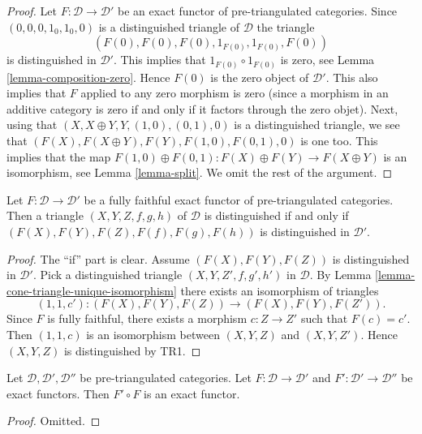 \begin{proof}
Let $F : \mathcal{D} \to \mathcal{D}'$ be an exact functor of
pre-triangulated categories. Since
$(0, 0, 0, 1_0, 1_0, 0)$ is a distinguished triangle of $\mathcal{D}$
the triangle
$$
(F(0), F(0), F(0), 1_{F(0)}, 1_{F(0)}, F(0))
$$
is distinguished in $\mathcal{D}'$.
This implies that $1_{F(0)} \circ 1_{F(0)}$ is zero, see
Lemma \ref{lemma-composition-zero}.
Hence $F(0)$ is the zero object of $\mathcal{D}'$. This also implies
that $F$ applied to any zero morphism is zero (since a morphism in
an additive category is zero if and only if it factors through the
zero objet). Next, using that
$(X, X \oplus Y, Y, (1, 0), (0, 1), 0)$ is a distinguished triangle,
we see that $(F(X), F(X \oplus Y), F(Y), F(1, 0), F(0, 1), 0)$ is
one too. This implies that the map
$F(1, 0) \oplus F(0, 1) : F(X) \oplus F(Y) \to F(X \oplus Y)$
is an isomorphism, see
Lemma \ref{lemma-split}.
We omit the rest of the argument.
\end{proof}

\begin{lemma}
\label{lemma-exact-equivalence}
Let $F : \mathcal{D} \to \mathcal{D}'$ be a fully faithful exact functor
of pre-triangulated categories. Then a triangle $(X, Y, Z, f, g, h)$
of $\mathcal{D}$ is distinguished if and only if
$(F(X), F(Y), F(Z), F(f), F(g), F(h))$ is distinguished in $\mathcal{D}'$.
\end{lemma}

\begin{proof}
The ``if'' part is clear. Assume $(F(X), F(Y), F(Z))$ is
distinguished in $\mathcal{D}'$. Pick a distinguished triangle
$(X, Y, Z', f, g', h')$ in $\mathcal{D}$. By
Lemma \ref{lemma-cone-triangle-unique-isomorphism}
there exists an isomorphism of triangles
$$
(1, 1, c') : (F(X), F(Y), F(Z)) \longrightarrow (F(X), F(Y), F(Z')).
$$
Since $F$ is fully faithful, there exists a morphism $c : Z \to Z'$
such that $F(c) = c'$. Then $(1, 1, c)$ is an isomorphism between
$(X, Y, Z)$ and $(X, Y, Z')$. Hence $(X, Y, Z)$ is distinguished
by TR1.
\end{proof}

\begin{lemma}
\label{lemma-composition-exact}
Let $\mathcal{D}, \mathcal{D}', \mathcal{D}''$ be pre-triangulated categories.
Let $F : \mathcal{D} \to \mathcal{D}'$ and
$F' : \mathcal{D}' \to \mathcal{D}''$ be exact functors.
Then $F' \circ F$ is an exact functor.
\end{lemma}

\begin{proof}
Omitted.
\end{proof}

